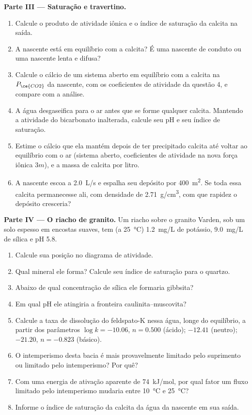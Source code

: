 \begin{problem}
\medskip\noindent\textbf{Parte III --- Saturação e travertino.}
\begin{enumerate}[resume]
\item Calcule o produto de atividade iônica e o índice de saturação da calcita
  na saída.
\item A nascente está em equilíbrio com a calcita? É uma nascente de conduto ou
  uma nascente lenta e difusa?
\item Calcule o cálcio de um sistema aberto em equilíbrio com a calcita na
  $P_{\ce{CO2}}$ da nascente, com os coeficientes de atividade da questão 4,
  e compare com a análise.
\item A água desgaseifica para o ar antes que se forme qualquer calcita. Mantendo a
  atividade do bicarbonato inalterada, calcule seu pH e seu índice de saturação.
\item Estime o cálcio que ela mantém depois de ter precipitado calcita até voltar
  ao equilíbrio com o ar (sistema aberto, coeficientes de atividade na nova
  força iônica $3m$), e a massa de calcita por litro.
\item A nascente escoa a \qty{2.0}{L/s} e espalha seu depósito por
  \qty{400}{m^2}. Se toda essa calcita permanecesse ali, com densidade de
  \qty{2.71}{g/cm^3}, com que rapidez o depósito cresceria?
\end{enumerate}

\medskip\noindent\textbf{Parte IV --- O riacho de granito.} Um riacho sobre o
granito Varden, sob um solo espesso em encostas suaves, tem (a
  \qty{25}{\celsius}) \qty{1.2}{mg/L} de potássio, \qty{9.0}{mg/L} de
  sílica e pH 5.8.
\begin{enumerate}[resume]
\item Calcule sua posição no diagrama de atividade.
\item Qual mineral ele forma? Calcule seu índice de saturação para o quartzo.
\item Abaixo de qual concentração de sílica ele formaria gibbsita?
\item Em qual pH ele atingiria a fronteira caulinita--muscovita?
\item Calcule a taxa de dissolução do feldspato-K nessa água, longe do
  equilíbrio, a partir dos parâmetros $\log k = -10.06$, $n = 0.500$ (ácido);
  $-12.41$ (neutro); $-21.20$, $n = -0.823$ (básico).
\item O intemperismo desta bacia é mais provavelmente limitado pelo suprimento ou
  limitado pelo intemperismo? Por quê?
\item Com uma energia de ativação aparente de \qty{74}{kJ/mol}, por qual fator
  um fluxo limitado pelo intemperismo mudaria entre \qty{10}{\celsius} e
  \qty{25}{\celsius}?
\item Informe o índice de saturação da calcita da água da nascente em sua
  saída.
\end{enumerate}
\end{problem}
